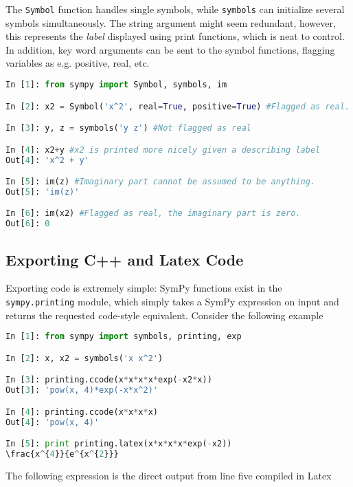 The \verb+Symbol+ function handles single symbols, while \verb+symbols+ can initialize several symbols simultaneously. The string argument might seem redundant, however, this represents the \textit{label} displayed using print functions, which is neat to control. In addition, key word arguments can be sent to the symbol functions, flagging variables as e.g. positive, real, etc.

\vspace{0.25cm}
\begin{lstlisting}[language=Python]
In [1]: from sympy import Symbol, symbols, im

In [2]: x2 = Symbol('x^2', real=True, positive=True) #Flagged as real. Note the label.

In [3]: y, z = symbols('y z') #Not flagged as real

In [4]: x2+y #x2 is printed more nicely given a describing label
Out[4]: 'x^2 + y'

In [5]: im(z) #Imaginary part cannot be assumed to be anything.
Out[5]: 'im(z)'

In [6]: im(x2) #Flagged as real, the imaginary part is zero.
Out[6]: 0

\end{lstlisting}

\subsection{Exporting C++ and Latex Code}

Exporting code is extremely simple: SymPy functions exist in the \verb+sympy.printing+ module, which simply takes a SymPy expression on input and returns the requested code-style equivalent. Consider the following example

\vspace{0.25cm}
\begin{lstlisting}[language=Python]
In [1]: from sympy import symbols, printing, exp

In [2]: x, x2 = symbols('x x^2')

In [3]: printing.ccode(x*x*x*x*exp(-x2*x))
Out[3]: 'pow(x, 4)*exp(-x*x^2)'

In [4]: printing.ccode(x*x*x*x)
Out[4]: 'pow(x, 4)'

In [5]: print printing.latex(x*x*x*x*exp(-x2))
\frac{x^{4}}{e^{x^{2}}}

\end{lstlisting}

The following expression is the direct output from line five compiled in Latex

